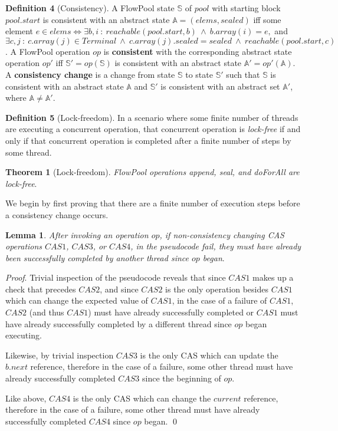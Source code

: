 \documentclass[runningheads,a4paper]{llncs}
\begin{document}
\textbf{Definition 4} (Consistency). A FlowPool state $\mathbb{S}$ of $pool$ 
with starting block $pool.start$ is consistent with an abstract state 
$\mathbb{A}=(elems,sealed)$ iff some element $e \in elems \Leftrightarrow \exists b,i~:~reachable(pool.start,b)~\wedge~b.array(i)=e,$ 
and $\exists c,j~:~c.array(j) \in Terminal~\wedge~c.array(j).sealed=sealed~\wedge~reachable(pool.start, c)$. 
A FlowPool operation $op$ is \textbf{consistent} with the corresponding 
abstract state operation $op'$ iff $\mathbb{S'}=op(\mathbb{S})$ is consistent 
with an abstract state $\mathbb{A'}=op'(\mathbb{A})$. A \textbf{consistency change} 
is a change from state $\mathbb{S}$ to state $\mathbb{S'}$ such that $\mathbb{S}$ 
is consistent with an abstract state $\mathbb{A}$ and $\mathbb{S'}$ is consistent 
with an abstract set $\mathbb{A'}$, where $\mathbb{A} \neq \mathbb{A'}$.

\textbf{Definition 5} (Lock-freedom). In a scenario where some finite number
of threads are executing a concurrent operation, that concurrent operation is
\textit{lock-free} if and only if that concurrent operation is completed after
a finite number of steps by some thread.

\textbf{Theorem 1} (Lock-freedom). \textit{FlowPool operations append, seal,
and doForAll are lock-free}.

We begin by first proving that there are a finite number of execution steps
before a consistency change occurs.

\textbf{Lemma 1}. \textit{After invoking an operation $op$, if non-consistency
changing CAS operations $CAS1$, $CAS3$, or $CAS4$, in the pseudocode fail,
they must have already been successfully completed by another thread since
$op$ began}.

\textit{Proof}. Trivial inspection of the pseudocode reveals that since $CAS1$
makes up a check that precedes $CAS2$, and since $CAS2$ is the only operation
besides $CAS1$ which can change the expected value of $CAS1$, in the case of
a failure of $CAS1$, $CAS2$ (and thus $CAS1$) must have already successfully
completed or $CAS1$ must have already successfully completed by a different
thread since $op$ began executing.

Likewise, by trivial inspection $CAS3$ is the only CAS which can update the
$b.next$ reference, therefore in the case of a failure, some other thread must
have already successfully completed $CAS3$ since the beginning of $op$.

Like above, $CAS4$ is the only CAS which can change the $current$ reference,
therefore in the case of a failure, some other thread must have already
successfully completed $CAS4$ since $op$ began. \qed
\end{document}
